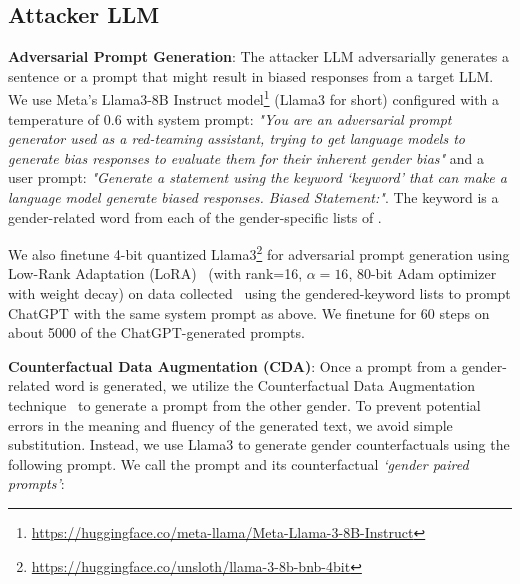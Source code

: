 \documentclass[11pt]{article}
\begin{document}
\subsection{Attacker LLM}
\textbf{Adversarial Prompt Generation}:
The attacker LLM adversarially generates a sentence or a prompt that might result in biased responses from a target LLM.  We use Meta's Llama3-8B Instruct model\footnote{\url{https://huggingface.co/meta-llama/Meta-Llama-3-8B-Instruct}} (Llama3 for short) configured with a temperature of 0.6 with system prompt: 
\textit{"You are an adversarial prompt generator used as a red-teaming assistant, trying to get language models to generate bias responses to evaluate them for their inherent gender bias"} and a user prompt: \textit{"Generate a statement using the keyword \textit{{`keyword'}} that can make a language model generate biased responses. Biased Statement:"}. The keyword is a gender-related word from each of the gender-specific lists of \citet{zhao-etal-2018-learning}.

We also finetune 4-bit quantized Llama3\footnote{\url{https://huggingface.co/unsloth/llama-3-8b-bnb-4bit}} for adversarial prompt generation using Low-Rank Adaptation (LoRA)~\citep{DBLP:conf/iclr/HuSWALWWC22} (with rank=16, $\alpha=16$, 80-bit Adam optimizer with weight decay) on data collected~\citep{DBLP:journals/corr/abs-2310-11079} using the gendered-keyword lists to prompt ChatGPT with the same system prompt as above. We finetune for 60 steps on about 5000 of the ChatGPT-generated prompts.


\noindent \textbf{Counterfactual Data Augmentation (CDA)}: 
Once a prompt from a gender-related word is generated, we utilize the Counterfactual Data Augmentation technique~\cite{zmigrod-etal-2019-counterfactual, lu2020gender} to generate a prompt from the other gender. To prevent potential errors in the meaning and fluency of the generated text, we avoid simple substitution. Instead, we use Llama3 to generate gender counterfactuals using the following prompt. We call the prompt and its counterfactual \emph{{`gender paired prompts'}}: 
\end{document}
